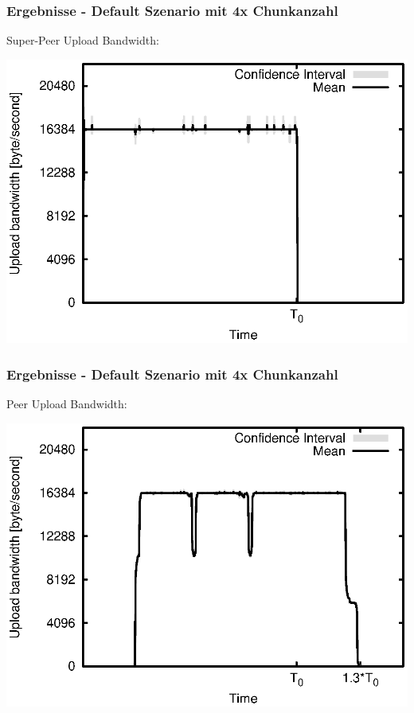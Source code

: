 \begin{frame}
  \frametitle{Ergebnisse - Default Szenario mit 4x Chunkanzahl}
  Super-Peer Upload Bandwidth:
  
  \begin{center}
    \includegraphics[width=1\textwidth]{fig/plots/scenario_15_chunk_count_fac_4/plots/GeneratedMeanCurrentSuperSeederUploadBandwidth.csv.eps}
  \end{center}
\end{frame}


\begin{frame}
  \frametitle{Ergebnisse - Default Szenario mit 4x Chunkanzahl}
  Peer Upload Bandwidth:
  
  \begin{center}
    \includegraphics[width=1\textwidth]{fig/plots/scenario_15_chunk_count_fac_4/plots/GeneratedMeanCurrentUploadBandwidth.csv.eps}
  \end{center}
\end{frame}


